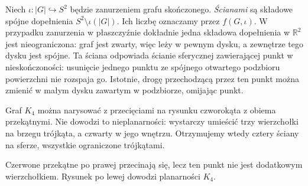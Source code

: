 \begin{definicja}[Ściana]
Niech $\iota:|G|\hookrightarrow S^2$ będzie zanurzeniem grafu
skończonego. \emph{Ścianami} są składowe spójne dopełnienia
$S^2\setminus\iota(|G|)$. Ich liczbę oznaczamy przez $f(G,\iota)$.
W przypadku zanurzenia w płaszczyźnie dokładnie jedna
składowa dopełnienia w $\mathbb R^2$ jest nieograniczona:
graf jest zwarty, więc leży w pewnym dysku, a zewnętrze
tego dysku jest spójne. Ta ściana odpowiada ścianie
sferycznej zawierającej punkt w nieskończoności:
usunięcie jednego punktu ze spójnego otwartego
podzbioru powierzchni nie rozspaja go. Istotnie,
drogę przechodzącą przez ten punkt można zmienić
w małym dysku zawartym w podzbiorze, omijając punkt.
\end{definicja}

\begin{przyklad}
Graf $K_4$ można narysować z przecięciami na rysunku czworokąta
z obiema przekątnymi. Nie dowodzi to nieplanarności: wystarczy
umieścić trzy wierzchołki na brzegu trójkąta, a czwarty w jego wnętrzu.
Otrzymujemy wtedy cztery ściany na sferze, wszystkie ograniczone
trójkątami.
\end{przyklad}

\begin{center}

{\footnotesize Czerwone przekątne po prawej przecinają się, lecz ten punkt
nie jest dodatkowym wierzchołkiem. Rysunek po lewej dowodzi planarności $K_4$.}
\end{center}

